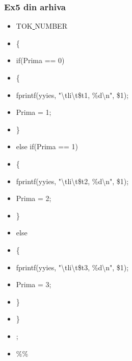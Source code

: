 \documentclass[pdf]{beamer}
\begin{document}
\begin{frame}[shrink=10]
\frametitle{Ex5 din arhiva}
\begin{itemize}
\item
 TOK\underline{ }NUMBER 
\item \quad
	\{ 
\item \qquad
		if(Prima == 0)
\item \qquad
		\{
\item \qquad \quad
			fprintf(yyies, "\textbackslash{t}li\textbackslash{t}\$t1, \%d\textbackslash{n}", \$1); 
\item \qquad \quad		
			Prima = 1;
\item \qquad
		\}
\item \qquad
		else if(Prima == 1)
\item \qquad
		\{
\item \qquad \quad
			fprintf(yyies, "\textbackslash{t}li\textbackslash{t}\$t2, \%d\textbackslash{n}", \$1);
\item \qquad \quad
			Prima = 2;
\item \qquad
		\}
\item \qquad
		else
\item \qquad
		\{
\item \qquad \quad
			fprintf(yyies, "\textbackslash{t}li\textbackslash{t}\$t3, \%d\textbackslash{n}", \$1); 
\item \qquad \quad
			Prima = 3;
\item \qquad
		\}
\item \quad
	\}
\item \hspace{2mm}
    ;
\item
\%\%
\end{itemize}
\end{frame}
\end{document}

